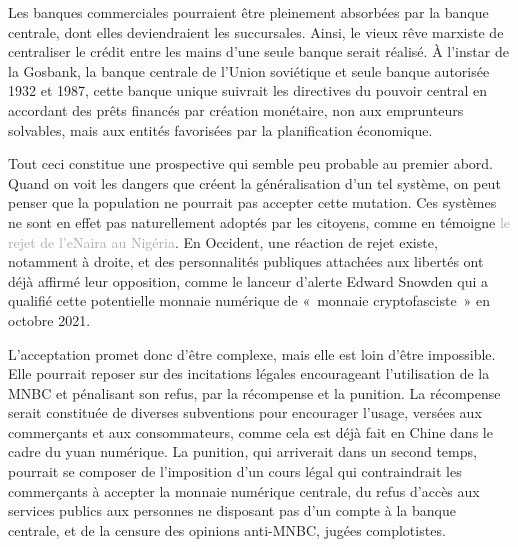Les banques commerciales pourraient être pleinement absorbées par la banque centrale, dont elles deviendraient les succursales. Ainsi, le vieux rêve marxiste de centraliser le crédit entre les mains d'une seule banque serait réalisé. À l'instar de la Gosbank, la banque centrale de l'Union soviétique et seule banque autorisée 1932 et 1987, cette banque unique suivrait les directives du pouvoir central en accordant des prêts financés par création monétaire, non aux emprunteurs solvables, mais aux entités favorisées par la planification économique.


Tout ceci constitue une prospective qui semble peu probable au premier abord. Quand on voit les dangers que créent la généralisation d'un tel système, on peut penser que la population ne pourrait pas accepter cette mutation. Ces systèmes ne sont en effet pas naturellement adoptés par les citoyens, comme en témoigne  \textcolor{darkgray}{le rejet de l'eNaira au Nigéria}. En Occident, une réaction de rejet existe, notamment à droite, et des personnalités publiques attachées aux libertés ont déjà affirmé leur opposition, comme le lanceur d'alerte Edward Snowden qui a qualifié cette potentielle monnaie numérique de «~monnaie cryptofasciste~» en octobre 2021.

L'acceptation promet donc d'être complexe, mais elle est loin d'être impossible. Elle pourrait reposer sur des incitations légales encourageant l'utilisation de la MNBC et pénalisant son refus, par la récompense et la punition. La récompense serait constituée de diverses subventions pour encourager l'usage, versées aux commerçants et aux consommateurs, comme cela est déjà fait en Chine dans le cadre du yuan numérique. La punition, qui arriverait dans un second temps, pourrait se composer de l'imposition d'un cours légal qui contraindrait les commerçants à accepter la monnaie numérique centrale, du refus d'accès aux services publics aux personnes ne disposant pas d'un compte à la banque centrale, et de la censure des opinions anti-MNBC, jugées complotistes. %

